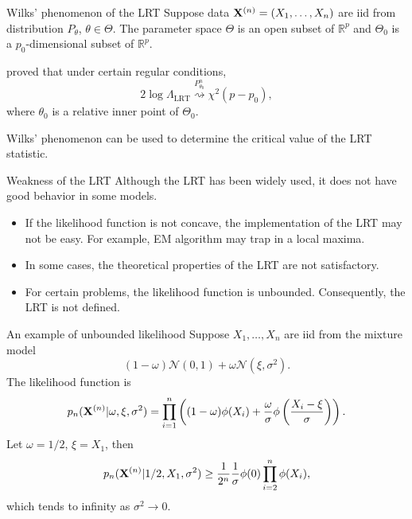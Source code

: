 \documentclass{beamer}
\theoremstyle{plain}
\theoremstyle{definition}
\theoremstyle{remark}
\begin{document}
\begin{frame}{Wilks' phenomenon of the LRT}
    Suppose data  $\mathbf{X}^{(n)}=(X_1,\ldots,X_n)$ are iid from distribution $P_{\theta}$, $\theta\in\Theta$. The parameter space $\Theta$ is an open subset of $\mathbb{R}^p$ and $\Theta_0$ is a $p_0$-dimensional subset of $\mathbb{R}^p$.

    \cite{Wilks1938The} proved that under certain regular conditions,
    \begin{equation*}
        2\log \Lambda_{\text{LRT}}\overset{P_{\theta_0}^n}{\rightsquigarrow} \chi^2(p-p_0),
    \end{equation*}
    where $\theta_0$ is a relative inner point of $\Theta_0$.

    Wilks' phenomenon can be used to determine the critical value of the LRT statistic.
\end{frame}


\begin{frame}{Weakness of the LRT}
    Although the LRT has been widely used, it does not have good behavior in some models.
    \begin{itemize}
        \item
            If the likelihood function is not concave, the implementation of the LRT may not be easy.
            For example, EM algorithm may trap in a local maxima.
        \item
            In some cases, the theoretical properties of the LRT are not satisfactory.
        \item
            For certain problems, the likelihood function is unbounded.
            Consequently, the LRT is not defined.
    \end{itemize}

\end{frame}

\begin{frame}{An example of unbounded likelihood}
        Suppose $X_1,\ldots,X_n$ are iid from the mixture model 
        \begin{equation*}
        (1-\omega)\mathcal{N}(0,1)+\omega\mathcal{N}(\xi,\sigma^2).
        \end{equation*}
        The likelihood function is
        \begin{equation*}
            p_n(\mathbf{X}^{(n)}|\omega,\xi,\sigma^2)=\prod_{i=1}^n \left((1-\omega)\phi(X_i)+ \frac{\omega}{\sigma} \phi\left(\frac{X_i-\xi}{\sigma}\right)\right).
        \end{equation*}
        Let $\omega=1/2$, $\xi=X_1$, then
        \begin{equation*}
            p_n(\mathbf{X}^{(n)}|1/2,X_1,\sigma^2)
            \geq
            \frac{1}{2^n}
            \frac{1}{\sigma} \phi(0)\prod_{i=2}^n \phi(X_i),
        \end{equation*}
        which tends to infinity as $\sigma^2\to 0$.

\end{frame}
\end{document}

